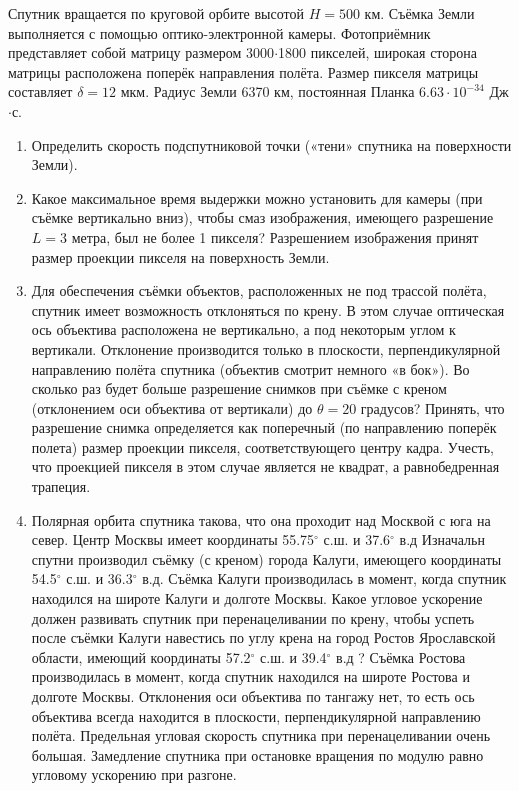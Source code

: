 
Спутник вращается по круговой орбите высотой $H=500$ км. Съёмка Земли выполняется с помощью оптико-электронной 
камеры. Фотоприёмник представляет собой матрицу размером 3000$\cdot$1800 пикселей, широкая сторона матрицы 
расположена поперёк направления полёта. Размер пикселя матрицы составляет $\delta=12$ мкм. Радиус Земли 6370 км, 
постоянная Планка $6.63\cdot 10^{-34}$ Дж$\cdot$с.

\begin{enumerate}
    \item Определить скорость подспутниковой точки («тени» спутника на поверхности Земли). 
    \item Какое максимальное время выдержки можно установить для камеры (при съёмке вертикально вниз), чтобы смаз 
    изображения, имеющего разрешение $L=3$ метра, был не более 1 пикселя? Разрешением изображения принят 
    размер проекции пикселя на поверхность Земли.
    \item Для обеспечения съёмки объектов, расположенных не под трассой полёта, спутник имеет 
    возможность отклоняться по крену. В этом случае оптическая ось объектива расположена не вертикально, 
    а под некоторым углом к вертикали. Отклонение производится только в плоскости, перпендикулярной 
    направлению полёта спутника (объектив смотрит немного «в бок»). Во сколько раз будет больше разрешение 
    снимков при съёмке с креном (отклонением оси объектива от вертикали) до $\theta=20$ градусов? Принять, 
    что разрешение снимка определяется как поперечный (по направлению поперёк полета) размер проекции пикселя, 
    соответствующего центру кадра. Учесть, что проекцией пикселя в этом случае является не квадрат, а 
    равнобедренная трапеция.
    \item Полярная орбита спутника такова, что она проходит над Москвой с юга на север. Центр Москвы имеет 
    координаты 55.75$^{\circ}$  с.ш. и 37.6$^{\circ}$  в.д Изначальн спутни производил съёмку (с креном) города 
    Калуги, имеющего координаты 54.5$^{\circ}$  с.ш. и 36.3$^{\circ}$ в.д. Съёмка Калуги производилась в момент, 
    когда спутник находился на широте Калуги и долготе Москвы. Какое угловое ускорение должен развивать 
    спутник при перенацеливании по крену, чтобы успеть после съёмки Калуги навестись по углу крена на город 
    Ростов Ярославской области, имеющий координаты 57.2$^{\circ}$ с.ш. и 39.4$^{\circ}$  в.д ? Съёмка Ростова 
    производилась в момент, когда спутник находился на широте Ростова и долготе Москвы. Отклонения оси 
    объектива по тангажу нет, то есть ось объектива всегда находится в плоскости, перпендикулярной направлению 
    полёта. Предельная угловая скорость спутника при перенацеливании очень большая. Замедление спутника при 
    остановке вращения по модулю равно угловому ускорению при разгоне. 
\end{enumerate}

